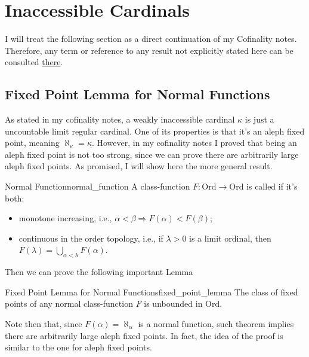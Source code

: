 \section{Inaccessible Cardinals}

I will treat the following section as a direct continuation of my Cofinality notes. Therefore, any term or reference to any result not explicitly stated here can be consulted \href{https://github.com/Xennonio/Cofinality}{there}.

\subsection{Fixed Point Lemma for Normal Functions}

As stated in my cofinality notes, a weakly inaccessible cardinal $\kappa$ is just a uncountable limit regular cardinal. One of its properties is that it's an aleph fixed point, meaning $\aleph_\kappa=\kappa$. However, in my cofinality notes I proved that being an aleph fixed point is not too strong, since we can prove there are arbitrarily large aleph fixed points. As promised, I will show here the more general result.

\begin{definition}{Normal Function}{normal_function}
    A class-function $F:\text{Ord}\to\text{Ord}$ is called  if it's both:
    \begin{itemize}
        \item monotone increasing, i.e., $\alpha<\beta\Rightarrow F(\alpha)<F(\beta)$;
        \item continuous in the order topology, i.e., if $\lambda>0$ is a limit ordinal, then $F(\lambda)=\bigcup_{\alpha<\lambda}F(\alpha)$.
    \end{itemize}
\end{definition}

Then we can prove the following important Lemma

\begin{lemma}{Fixed Point Lemma for Normal Functions}{fixed_point_lemma}
    The class of fixed points of any normal class-function $F$ is unbounded in $\text{Ord}$.
\end{lemma}

Note then that, since $F(\alpha)=\aleph_\alpha$ is a normal function, such theorem implies there are arbitrarily large aleph fixed points. In fact, the idea of the proof is similar to the one for aleph fixed points.

